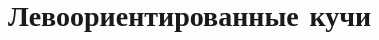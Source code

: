 \documentclass[aspectratio=169
  , xcolor={svgnames}
  , hyperref={ colorlinks,citecolor=DeepPink4
             , linkcolor=DarkRed,urlcolor=DarkBlue}
  , russian
  ]{beamer}
\theoremstyle{exerciseStyle1}
\begin{document}
\section{Левоориентированные кучи}

\begin{frame}[fragile]{}
\inputminted[firstline=3, lastline=11] {haskell}{code/Heap.hs}
\end{frame}
% 
\end{document}
